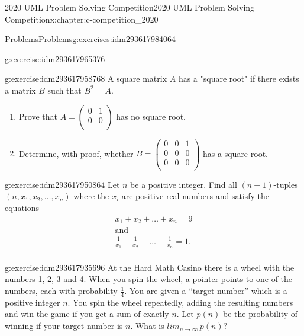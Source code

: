 \documentclass[twoside,10pt,]{book}
\numberwithin{equation}{section}
\begin{document}
\begin{chapterptx}{2020 UML Problem Solving Competition}{}{2020 UML Problem Solving Competition}{}{}{x:chapter:c-competition_2020}
\begin{exercises-section}{Problems}{}{Problems}{}{}{g:exercises:idm293617984064}
\begin{divisionexercise}{3}{}{}{g:exercise:idm293617965376}
\end{divisionexercise}%
\begin{divisionexercise}{4}{}{}{g:exercise:idm293617958768}%
A square matrix \(A\) has a "square root" if there exists a matrix \(B\) such that \(B^2 = A\).%
\begin{enumerate}[label=(\alph*)]
\item{}Prove that \(A = \left(
\begin{array}{cc}
0 & 1 \\
0 & 0 \\
\end{array}
\right)\)  has no square root.%
\item{}Determine, with proof, whether \(B=\left(
\begin{array}{ccc}
0 & 0 & 1 \\
0 & 0 & 0 \\
0 & 0 & 0 \\
\end{array}
\right)\) has a square root.%
\end{enumerate}
%
\end{divisionexercise}%
\begin{divisionexercise}{5}{}{}{g:exercise:idm293617950864}%
Let \(n\) be a positive integer.  Find all \((n+1)\)-tuples \((n, x_1, x_2, \dots , x_n)\) where the \(x_i\) are positive real numbers and satisfy the equations%
\begin{equation*}
\begin{array}{cc}
x_1 + x_2 + \dots + x_n = 9 \\
\textrm{and}\\
\frac{1}{x_1}+\frac{1}{x_2} + \dots + \frac{1}{x_n} = 1. \\
\end{array}
\end{equation*}
%
\end{divisionexercise}%
\begin{divisionexercise}{6}{}{}{g:exercise:idm293617935696}%
At the Hard Math Casino there is a wheel with the numbers 1, 2, 3 and 4.  When you spin the wheel, a pointer points to one of the numbers, each with probability \(\frac{1}{4}\). You are given a “target number” which  is a positive integer \(n\). You spin the wheel repeatedly, adding the resulting  numbers and win the game if you get a sum of exactly \(n\). Let \(p(n)\) be the probability of winning if your target number is \(n\).  What is \(lim_{n\rightarrow \infty}\, p(n)\)?%
\end{divisionexercise}%
\end{exercises-section}
\end{chapterptx}
\end{document}
